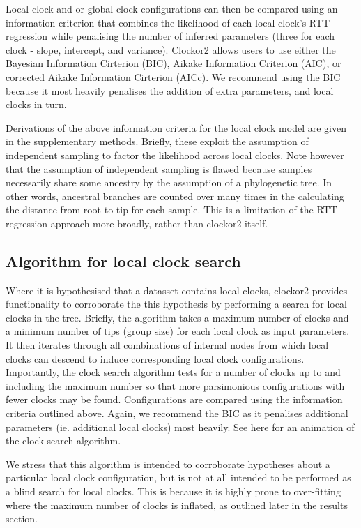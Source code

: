 \documentclass{article}
\begin{document}
Local clock and or global clock configurations can then be compared using an information criterion that combines the likelihood of each local clock's RTT regression while penalising the number of inferred parameters (three for each clock - slope, intercept, and variance). Clockor2 allows users to use either the Bayesian Information Cirterion (BIC), Aikake Information Criterion (AIC), or corrected Aikake Information Cirterion (AICc). We recommend using the BIC because it most heavily penalises the addition of extra parameters, and local clocks in turn.

Derivations of the above information criteria for the local clock model are given in the supplementary methods. Briefly, these exploit the assumption of independent sampling to factor the likelihood across local clocks. Note however that the assumption of independent sampling is flawed because samples necessarily share some ancestry by the assumption of a phylogenetic tree. In other words, ancestral branches are counted over many times in the calculating the distance from root to tip for each sample. This is a limitation of the RTT regression approach more broadly, rather than clockor2 itself.


\subsection*{Algorithm for local clock search}
Where it is hypothesised that a datasset contains local clocks, clockor2 provides functionality to corroborate the this hypothesis by performing a search for local clocks in the tree. Briefly, the algorithm takes a maximum number of clocks and a minimum number of tips (group size) for each local clock as input parameters. It then iterates through all combinations of internal nodes from which local clocks can descend to induce corresponding local clock configurations. Importantly, the clock search algorithm tests for a number of clocks up to and including the maximum number so that more parsimonious configurations with fewer clocks may be found. Configurations are compared using the information criteria outlined above. Again, we recommend the BIC as it penalises additional parameters (ie. additional local clocks) most heavily. See \href{https://github.com/LeoFeatherstone/clockor2Paper/blob/main/figures/clockSearchEg2Clocks.gif}{here for an animation} of the clock search algorithm. 

We stress that this algorithm is intended to corroborate hypotheses about a particular local clock configuration, but is not at all intended to be performed as a blind search for local clocks. This is because it is highly prone to over-fitting where the maximum number of clocks is inflated, as outlined later in the results section.
\end{document}
